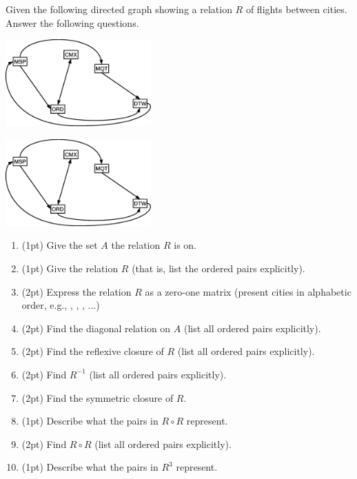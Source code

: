\begin{questions}
	\ifprintanswers
		\vspace{-10pt}
	\fi 
{}  Given the following directed graph showing a relation $R$ of flights between cities.  Answer the following questions.
\ifprintanswers
\begin{center}
	\includegraphics[width=2.2in]{figs/example_relations_fig1}
\end{center}
\else
\begin{center}	
	\includegraphics[width=2.2in]{figs/example_relations_fig1}
\end{center}
\fi
\begin{enumerate}[label=(\alph*),itemsep=0pt,parsep=0pt,topsep=0pt,partopsep=0pt]
	\item (1pt) Give the set $A$ the relation $R$ is on.
	\item (1pt) Give the relation $R$ (that is, list the ordered pairs explicitly).
	\item (2pt) Express the relation $R$ as a zero-one matrix (present cities in alphabetic order, e.g., \CMX, \DTW, \MQT, ...)
	\item (2pt) Find the diagonal relation on $A$ (list all ordered pairs explicitly). 
	\item (2pt) Find the reflexive closure of $R$ (list all ordered pairs explicitly).
	\item (2pt) Find $R^{-1}$ (list all ordered pairs explicitly).
	\item (2pt) Find the symmetric closure of $R$. 
	\item (1pt) Describe what the pairs in $R \circ R$ represent.
	\item (2pt) Find $R \circ R$ (list all ordered pairs explicitly). 
	\item (1pt) Describe what the pairs in $R^3$ represent.

\end{enumerate}
\end{questions}
